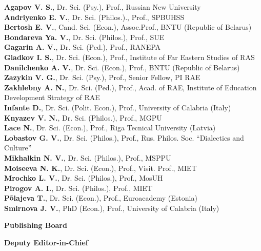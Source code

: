 \begin{otherlanguage}{english}
\begin{minipage}[t]{.48\textwidth}
\begin{flushleft}
\vspace{1em}
\textbf{Agapov V. S.}, Dr. Sci. (Psy.), Prof., Russian New University\\
\textbf{Andriyenko E. V.}, Dr. Sci. (Philos.)., Prof., SPBUHSS\\
\textbf{Bertosh E. V.}, Cand. Sci. (Econ.), Assoc.Prof., BNTU
(Republic of Belarus)\\
\textbf{Bondareva Ya. V.}, Dr. Sci. (Philos.), Prof., SUE\\
\textbf{Gagarin A. V.}, Dr. Sci. (Ped.), Prof., RANEPA\\
\textbf{Gladkov I. S.}, Dr. Sci. (Econ.), Prof.,
Institute of Far Eastern Studies of RAS\\
\textbf{Danilchenko A. V.}, Dr. Sci. (Econ.), Prof., BNTU
(Republic of Belarus)\\
\textbf{Zazykin V. G.}, Dr. Sci. (Psy.), Prof.,
Senior Fellow, PI RAE\\
\textbf{Zakhlebny A. N.}, Dr. Sci. (Ped.), Prof., Acad. of RAE,
Institute of Education Development Strategy of RAE\\
\textbf{Infante D.}, Dr. Sci. (Polit. Econ.), Prof.,
University of Calabria (Italy)\\
\textbf{Knyazev V. N.}, Dr. Sci. (Philos.), Prof., MGPU\\
\textbf{Lace N.}, Dr. Sci. (Econ.), Prof., Riga Tecnical University
(Latvia)\\
\textbf{Lobastov G. V.}, Dr. Sci. (Philos.), Prof., Rus. Philos.
Soc. ``Dialectics and Culture''\\
\textbf{Mikhalkin N. V.}, Dr. Sci. (Philos.), Prof., MSPPU\\
\textbf{Moiseeva N. K.}, Dr. Sci. (Econ.), Prof., Visit. Prof., MIET\\
\textbf{Mrochko L. V.}, Dr. Sci. (Philos.), Prof., MosUH\\
\textbf{Pirogov A. I.}, Dr. Sci. (Philos.), Prof., MIET\\
\textbf{Põlajeva T.}, Dr. Sci. (Econ.), Prof., Euroacademy
(Estonia)\\
\textbf{Smirnova J. V.}, PhD (Econ.), Prof., University of Calabria
(Italy)
\end{flushleft}
\end{minipage}\hspace{0.04\textwidth}
\begin{minipage}[t]{.48\textwidth}
    
    \begin{flushleft}
        \footnotesize
\begin{center}
        \textbf{Publishing Board}
\end{center}
\textbf{Deputy Editor-in-Chief}


\end{flushleft}
\end{minipage}
\end{otherlanguage}
